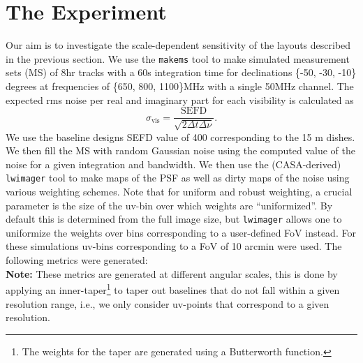 \documentclass[sfheadings,a4paper,times,9pt,floats,floatfix]{article}
\begin{document}
\section{The Experiment}\label{sec:exp}
Our aim is to investigate the scale-dependent sensitivity of the layouts described in the previous section.
We use the \texttt{makems} tool to make simulated measurement sets (MS) of 8hr tracks with a 60s integration time for declinations
\{-50, -30, -10\} degrees at frequencies of \{650, 800, 1100\}MHz with a single 50MHz channel. The expected rms noise per real
and imaginary part for each visibility is calculated as 
\begin{equation}
\sigma_{\text{vis}} = \frac{\text{SEFD}}{\sqrt{2\Delta t\Delta \nu}}.
\end{equation}
We use the baseline designs SEFD value of 400 corresponding to the 15 m dishes. We then fill the MS with random Gaussian noise
using the computed value of the noise for a given integration and bandwidth. We then use the (CASA-derived) \texttt{lwimager} tool
to make maps of the PSF as well as dirty maps of the noise using various weighting schemes. Note that for uniform and robust
weighting, a crucial parameter is the size of the uv-bin over which weights are “uniformized”. By default this is determined from
the full image size, but \texttt{lwimager} allows one to uniformize the weights over bins corresponding to a user-defined FoV
instead. For these simulations uv-bins corresponding to a FoV of 10 arcmin were used. The following metrics were generated:\\ {\bf
Note:} These metrics are generated at different angular scales, this is done by applying an inner-taper\footnote{The weights for
the taper are generated using a Butterworth function.} to taper out baselines that do not fall within a given resolution range,
i.e., we only consider uv-points that correspond to a given resolution.
\end{document}
